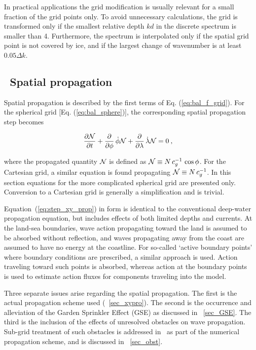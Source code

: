 In practical applications the grid modification is usually relevant for a
small fraction of the grid points only. To avoid unnecessary calculations, the
grid is transformed only if the smallest relative depth $kd$ in the discrete
spectrum is smaller than 4. Furthermore, the spectrum is interpolated only if
the spatial grid point is not covered by ice, and if the largest change of
wavenumber is at least $0.05 \Delta k$.


\vssub
\subsection{~Spatial propagation} \label{sub:xy_prop}
\vssub

Spatial propagation is described by the first terms of
Eq. (\ref{eq:bal_f_grid}). For the spherical grid [Eq. (\ref{eq:bal_sphere})],
the corresponding spatial propagation step becomes


\begin{equation}
\frac{\partial {\cal N}}{\partial t} + \frac{\partial}{\partial \phi} \, \dot{\phi} {\cal N} +
\frac{\partial}{\partial \lambda} \, \dot{\lambda} {\cal N} = 0
\: , \label{eq:step_xy_prop} 
\end{equation}

\noindent 
where the propagated quantity ${\cal N}$ is defined as ${\cal N} \equiv N \, c_g^{-1} \,
\cos\phi$. For the Cartesian grid, a similar equation is found propagating
${\cal N} \equiv N \, c_g^{-1}$. In this section equations for the more complicated
spherical grid are presented only. Conversion to a Cartesian grid is generally
a simplification and is trivial.

Equation~(\ref{eq:step_xy_prop}) in form is identical to the conventional
deep-water propagation equation, but includes effects of both limited depths
and currents. At the land-sea boundaries, wave action propagating toward the
land is assumed to be absorbed without reflection, and waves propagating away
from the coast are assumed to have no energy at the coastline. For so-called
`active boundary points' where boundary conditions are prescribed, a similar
approach is used. Action traveling toward such points is absorbed, whereas
action at the boundary points is used to estimate action fluxes for components
traveling into the model.

Three separate issues arise regarding the spatial propagation. The first is
the actual propagation scheme used (\para~\ref{sec_xypro}). The second is
the occurrence and alleviation of the Garden Sprinkler Effect (GSE) as
discussed in \para~\ref{sec_GSE}. The third is the inclusion of the effects
of unresolved obstacles on wave propagation. Sub-grid treatment of such
obstacles is addressed in \ws\ as part of the numerical propagation scheme,
and is discussed in \para~\ref{sec_obst}.


